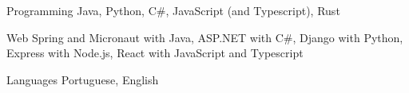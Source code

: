 


\begin{cvskills}


  \cvskill
  {Programming} %
  {Java, Python, C\#, JavaScript (and Typescript), Rust} %


  \cvskill
  {Web} %
  {Spring and Micronaut with Java, ASP.NET with C\#, Django with Python, Express with Node.js, React with JavaScript and Typescript} %


  \cvskill
  {Languages} %
  {Portuguese, English} %


\end{cvskills}
